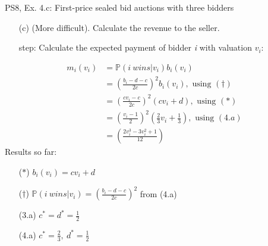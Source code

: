 \begin{frame}{PS8, Ex. 4.c: First-price sealed bid auctions with three bidders}
    \begin{itemize}
      \item[(c)] (More difficult). Calculate the revenue to the seller.
    \end{itemize}
    \vspace{-8pt}
    \begin{multicols}{2}
      \begin{itemize}
        \item[\nth{1} step:] Calculate the expected payment of bidder \textit{i} with valuation $v_i$:
      \end{itemize}
      \vspace{-4pt}
      \begin{align*}
        m_i(v_i)&=\mathbb{P}(i\ wins|v_i)b_i(v_i)\\
                &=\left(\frac{b_i-d-c}{2c}\right)^2b_i(v_i),\text{ using }(\dagger)\\
                &=\left(\frac{cv_i-c}{2c}\right)^2(cv_i+d),\text{ using }(*)\\
                &=\left(\frac{v_i-1}{2}\right)^2\left(\frac{2}{3}v_i+\frac{1}{3}\right),\text{ using }(4.a)\\
                &=\left(\frac{2v_i^3-3v_i^2+1}{12}\right)
      \end{align*}
      \vfill\null\columnbreak
      Results so far:
      \vspace{-6pt}
      \begin{itemize}
        \item[($*$)] $b_i(v_i) = cv_i+d$
        \item[($\dagger$)] $\mathbb{P}(i\ wins|v_i)=\left(\frac{b_i-d-c}{2c}\right)^2$ from (4.a)
        \item[(3.a)] $c^*=d^*=\frac{1}{2}$
        \item[(4.a)] $c^*=\frac{2}{3},\ d^*=\frac{1}{2}$
      \end{itemize}
      \vfill\null
    \end{multicols}
    \vfill\null
\end{frame}
